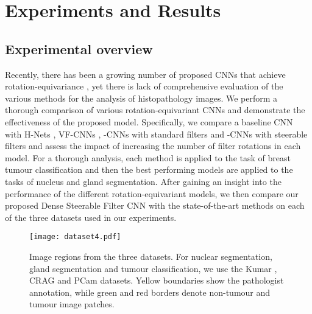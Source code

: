 \documentclass[journal]{IEEEtran}
\begin{document}
	\section{Experiments and Results}\label{section:expandresults}
    
    \subsection{Experimental overview}
    \label{section:expoverview}
    Recently, there has been a growing number of proposed CNNs that achieve rotation-equivariance \cite{cohen2016group, weiler2018learning, marcos2017rotation, bekkers2018roto, worrall2017harmonic}, yet there is lack of comprehensive evaluation of the various methods for the analysis of histopathology images. We perform a thorough comparison of various rotation-equivariant CNNs and demonstrate the effectiveness of the proposed model. Specifically, we compare a baseline CNN with H-Nets \cite{worrall2017harmonic}, VF-CNNs \cite{marcos2017rotation}, -CNNs with standard filters \cite{cohen2016group, bekkers2018roto} and -CNNs with steerable filters \cite{weiler2018learning} and assess the impact of increasing the number of filter rotations in each model. For a thorough analysis, each method is applied to the task of breast tumour classification and then the best performing models are applied to the tasks of nucleus and gland segmentation. After gaining an insight into the performance of the different rotation-equivariant models, we then compare our proposed Dense Steerable Filter CNN with the state-of-the-art methods on each of the three datasets used in our experiments.
    
    		\begin{figure*}[t]
		\centering
        \texttt{[image: dataset4.pdf]}
		\caption{Image regions from the three datasets. For nuclear segmentation, gland segmentation and tumour classification, we use the Kumar \cite{kumar2017dataset}, CRAG \cite{graham2019mild} and PCam \cite{veeling2018rotation} datasets. Yellow boundaries show the pathologist annotation, while green and red borders denote non-tumour and tumour image patches.} 
		\label{fig:images}
	\end{figure*}
	
\end{document}
